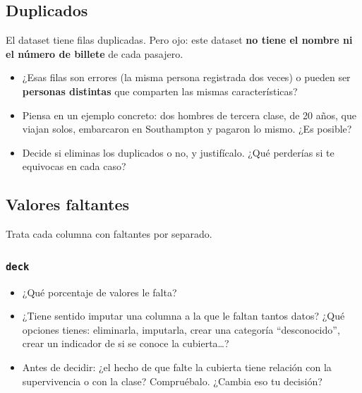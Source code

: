 \documentclass[11pt,a4paper]{article}
\newcommand{\col}[1]{\texttt{#1}}
\begin{document}
\subsection{Duplicados}

El dataset tiene filas duplicadas. Pero ojo: este dataset \textbf{no tiene el nombre ni el
número de billete} de cada pasajero.
\begin{itemize}
  \item ¿Esas filas son errores (la misma persona registrada dos veces) o pueden ser
        \textbf{personas distintas} que comparten las mismas características?
  \item Piensa en un ejemplo concreto: dos hombres de tercera clase, de 20 años, que
        viajan solos, embarcaron en Southampton y pagaron lo mismo. ¿Es posible?
  \item Decide si eliminas los duplicados o no, y justifícalo. ¿Qué perderías si te
        equivocas en cada caso?
\end{itemize}

\subsection{Valores faltantes}

Trata cada columna con faltantes por separado.

\subsubsection*{\col{deck}}
\begin{itemize}
  \item ¿Qué porcentaje de valores le falta?
  \item ¿Tiene sentido imputar una columna a la que le faltan tantos datos? ¿Qué opciones
        tienes: eliminarla, imputarla, crear una categoría ``desconocido'', crear un
        indicador de si se conoce la cubierta\ldots?
  \item Antes de decidir: ¿el hecho de que falte la cubierta tiene relación con la
        supervivencia o con la clase? Compruébalo. ¿Cambia eso tu decisión?
\end{itemize}
\end{document}

